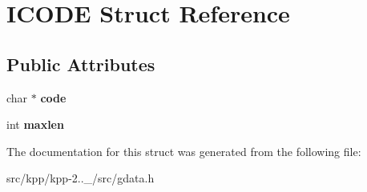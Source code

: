 \hypertarget{structICODE}{}\section{I\+C\+O\+DE Struct Reference}
\label{structICODE}
\subsection*{Public Attributes}
\begin{DoxyCompactItemize}
\item 
\mbox{\label{structICODE_a2517d75fa84c589d4b2846d86477e069}} 
char $\ast$ {\bfseries code}
\item 
\mbox{\label{structICODE_ac7fb5f8d9bf87768c8cc1845e266a74a}} 
int {\bfseries maxlen}
\end{DoxyCompactItemize}


The documentation for this struct was generated from the following file\+:\begin{DoxyCompactItemize}
\item 
src/kpp/kpp-\/2..\+\_/src/gdata.\+h\end{DoxyCompactItemize}
